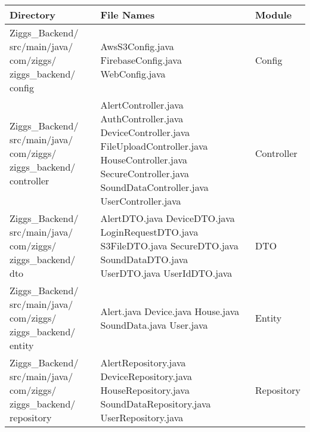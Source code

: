 \documentclass[conference]{IEEEtran}
\begin{document}
\begin{table}[H]
\centering
\renewcommand{\arraystretch}{1.5}
\begin{tabular}{|m{2.6cm}|m{3.5cm}|m{1.6cm}|}
\hline
\textbf{Directory} & \textbf{File Names} & \textbf{Module} \\ \hline

Ziggs\_Backend/ src/main/java/ com/ziggs/ ziggs\_backend/ config & 
AwsS3Config.java \newline 
FirebaseConfig.java \newline 
WebConfig.java & 
Config \\ \hline

Ziggs\_Backend/ src/main/java/ com/ziggs/ ziggs\_backend/ controller & 
AlertController.java \newline 
AuthController.java \newline 
DeviceController.java \newline 
FileUploadController.java \newline 
HouseController.java \newline 
SecureController.java \newline 
SoundDataController.java \newline 
UserController.java& 
Controller \\ \hline

Ziggs\_Backend/ src/main/java/ com/ziggs/ ziggs\_backend/ dto & 
AlertDTO.java \newline 
DeviceDTO.java \newline 
LoginRequestDTO.java \newline 
S3FileDTO.java \newline 
SecureDTO.java \newline 
SoundDataDTO.java \newline 
UserDTO.java \newline 
UserIdDTO.java & 
DTO \\ \hline

Ziggs\_Backend/ src/main/java/ com/ziggs/ ziggs\_backend/ entity & 
Alert.java \newline 
Device.java \newline 
House.java \newline 
SoundData.java \newline 
User.java& 
Entity \\ \hline

Ziggs\_Backend/ src/main/java/ com/ziggs/ ziggs\_backend/ repository & 
AlertRepository.java \newline 
DeviceRepository.java \newline 
HouseRepository.java \newline 
SoundDataRepository.java \newline 
UserRepository.java & 
Repository \\ \hline


\end{tabular}
\end{table}
\end{document}
